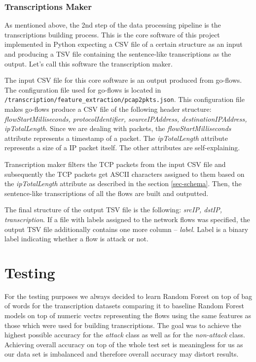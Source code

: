 \documentclass{article}
\begin{document}
\subsubsection{Transcriptions Maker}
As mentioned above, the 2nd step of the data processing pipeline is the transcriptions building process. This is the core software of this project implemented in Python expecting a CSV file of a certain structure as an input and producing a TSV file containing the sentence-like transcriptions as the output. Let's call this software the transcription maker.

The input CSV file for this core software is an output produced from go-flows. The configuration file used for go-flows is located in \verb|/transcription/feature_extraction/pcap2pkts.json|. This configuration file makes go-flows produce a CSV file of the following header structure: \textit{flowStartMilliseconds, protocolIdentifier, sourceIPAddress, destinationIPAddress, ipTotalLength}. Since we are dealing with packets, the \textit{flowStartMilliseconds} attribute represents a timestamp of a packet. The \textit{ipTotalLength} attribute represents a size of a IP packet itself. The other attributes are self-explaining.

Transcription maker filters the TCP packets from the input CSV file and subsequently the TCP packets get ASCII characters assigned to them based on the \textit{ipTotalLength} attribute as described in the section \ref{sec-schema}. Then, the sentence-like transcriptions of all the flows are built and outputted.

The final structure of the output TSV file is the following: \textit{srcIP, dstIP, transcription}. If a file with labels assigned to the network flows was specified, the output TSV file additionally contains one more column -- \textit{label}. Label is a binary label indicating whether a flow is attack or not.


\section{Testing}

For the testing purposes we always decided to learn Random Forest on top of bag of words for the transcription datasets comparing it to baseline Random Forest models on top of numeric vectrs representing the flows using the same features as those which were used for building transcriptions. The goal was to achieve the highest possible accuracy for the \textit{attack} class as well as for the \textit{non-attack} class. Achieving overall accuracy on top of the whole test set is meaningless for us as our data set is imbalanced and therefore overall accuracy may distort results.
\end{document}
